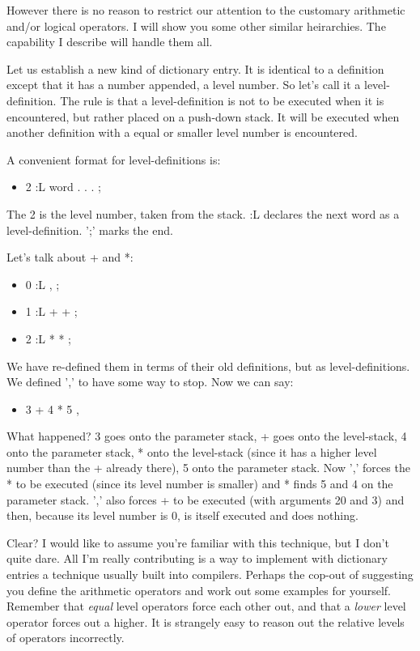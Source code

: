 \documentclass[b5paper, oneside]{book}
\begin{document}
However there is no reason to restrict our attention to the customary arithmetic and/or logical operators. I will show you some other similar heirarchies. The capability I describe will handle them all.

Let us establish a new kind of dictionary entry. It is identical to a definition except that it has a number appended, a level number. So let's call it a level-definition. The rule is that a level-definition is not to be executed when it is encountered, but rather placed on a push-down stack. It will be executed when another definition with a equal or smaller level number is encountered.

A convenient format for level-definitions is:\begin{itemize}
   \item 2 :L word . . . ;\end{itemize}
The 2 is the level number, taken from the stack. :L declares the next word as a level-definition. ';' marks the end.

Let's talk about + and *:\begin{itemize}
   \item 0 :L , ;
   \item 1 :L + + ;
   \item 2 :L * * ;\end{itemize}
We have re-defined them in terms of their old definitions, but as level-definitions. We defined ',' to have some way to stop. Now we can say:\begin{itemize}
   \item 3 + 4 * 5 ,\end{itemize}
What happened? 3 goes onto the parameter stack, + goes onto the level-stack, 4 onto the parameter stack, * onto the level-stack (since it has a higher level number than the + already there), 5 onto the parameter stack. Now ',' forces the * to be executed (since its level number is smaller) and * finds 5 and 4 on the parameter stack. ',' also forces + to be executed (with arguments 20 and 3) and then, because its level number is 0, is itself executed and does nothing.

Clear? I would like to assume you're familiar with this technique, but I don't quite dare. All I'm really contributing is a way to implement with dictionary entries a technique usually built into compilers. Perhaps the cop-out of suggesting you define the arithmetic operators and work out some examples for yourself. Remember that {\em equal} level operators force each other out, and that a {\em lower} level operator forces out a higher. It is strangely easy to reason out the relative levels of operators incorrectly.
\end{document}
